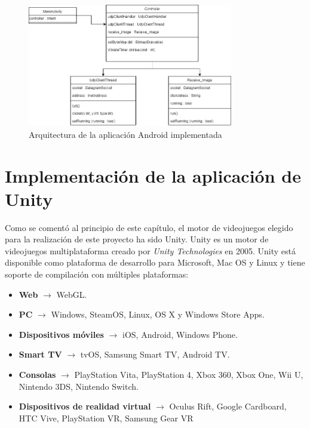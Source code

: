 \begin{figure}[h]

\centering
\includegraphics[width=0.8\textwidth]{./Imagenes/Bitmap/Arquitectura_App_Android}
\caption{Arquitectura de la aplicaci\'on Android implementada}
\end{figure}


\section{Implementaci\'on de la aplicaci\'on de Unity}

Como se coment\'o al principio de este cap\'itulo, el motor de videojuegos elegido para la realizaci\'on de este proyecto ha sido Unity. Unity es un motor de videojuegos multiplataforma creado por \textit{Unity Technologies} en 2005. Unity est\'a disponible como plataforma de desarrollo para Microsoft, Mac OS y Linux y tiene soporte de compilaci\'on con m\'ultiples plataformas:

\begin {itemize}
\item \textbf{Web} $\rightarrow$ WebGL.
\item \textbf{PC} $\rightarrow$ Windows, SteamOS, Linux, OS X y Windows Store Apps.
\item \textbf{Dispositivos m\'oviles} $\rightarrow$ iOS, Android, Windows Phone.
\item \textbf{Smart TV} $\rightarrow$ tvOS, Samsung Smart TV, Android TV.
\item \textbf{Consolas} $\rightarrow$ PlayStation Vita, PlayStation 4, Xbox 360, Xbox One, Wii U, Nintendo 3DS, Nintendo Switch.
\item \textbf{Dispositivos de realidad virtual} $\rightarrow$ Oculus Rift, Google Cardboard, HTC Vive, PlayStation VR, Samsung Gear VR
\end {itemize}

